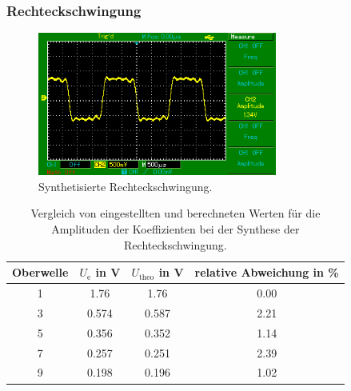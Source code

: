 \subsubsection{Rechteckschwingung}
\begin{figure}
  \centering
  \includegraphics[width=0.7\textwidth]{rechteck.png}
  \caption{Synthetisierte Rechteckschwingung.}
  \label{fig:rechteck_synthese}
\end{figure}
\begin{table}
  \centering
  \begin{tabular}{c c c c}
    \toprule
    Oberwelle & $U_\text{e}$ in \si{\volt} & $U_\text{theo}$ in \si{\volt} &
    relative Abweichung in \% \\
    \midrule
    1 & 1.76  & 1.76  & 0.00 \\
    3 & 0.574 & 0.587 & 2.21 \\
    5 & 0.356 & 0.352 & 1.14 \\
    7 & 0.257 & 0.251 & 2.39 \\
    9 & 0.198 & 0.196 & 1.02 \\
    \bottomrule
  \end{tabular}
  \caption{Vergleich von eingestellten und berechneten Werten für die Amplituden
    der Koeffizienten bei der Synthese der Rechteckschwingung.}
  \label{tab:synthese_rechteck}
\end{table}

\newpage
